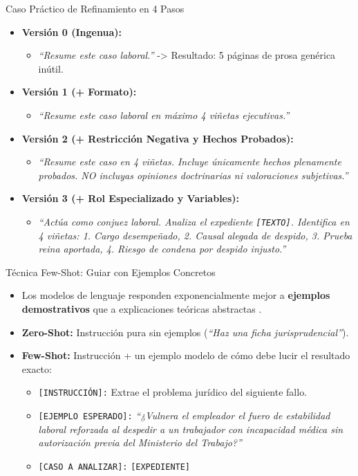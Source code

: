 \documentclass[aspectratio=169]{beamer}
\begin{document}
\begin{frame}{Caso Práctico de Refinamiento en 4 Pasos}

\begin{itemize}
  \item \textbf{Versión 0 (Ingenua):}
  \begin{itemize}
    \item \textit{``Resume este caso laboral.''} -> Resultado: 5 páginas de prosa genérica inútil.
  \end{itemize}
  \item \textbf{Versión 1 (+ Formato):}
  \begin{itemize}
    \item \textit{``Resume este caso laboral en máximo 4 viñetas ejecutivas.''}
  \end{itemize}
  \item \textbf{Versión 2 (+ Restricción Negativa y Hechos Probados):}
  \begin{itemize}
    \item \textit{``Resume este caso en 4 viñetas. Incluye únicamente hechos plenamente probados. NO incluyas opiniones doctrinarias ni valoraciones subjetivas.''}
  \end{itemize}
  \item \textbf{Versión 3 (+ Rol Especializado y Variables):}
  \begin{itemize}
    \item \textit{``Actúa como conjuez laboral. Analiza el expediente \texttt{[TEXTO]}. Identifica en 4 viñetas: 1. Cargo desempeñado, 2. Causal alegada de despido, 3. Prueba reina aportada, 4. Riesgo de condena por despido injusto.''}
  \end{itemize}
\end{itemize}
\end{frame}

\begin{frame}{Técnica Few-Shot: Guiar con Ejemplos Concretos}

\begin{itemize}
  \item Los modelos de lenguaje responden exponencialmente mejor a \textbf{ejemplos demostrativos} que a explicaciones teóricas abstractas \cite{sal2024}.
  \item \textbf{Zero-Shot:} Instrucción pura sin ejemplos (\textit{``Haz una ficha jurisprudencial''}).
  \item \textbf{Few-Shot:} Instrucción + un ejemplo modelo de cómo debe lucir el resultado exacto:
  \begin{itemize}
    \item \texttt{[INSTRUCCIÓN]:} Extrae el problema jurídico del siguiente fallo.
    \item \texttt{[EJEMPLO ESPERADO]:} \textit{``¿Vulnera el empleador el fuero de estabilidad laboral reforzada al despedir a un trabajador con incapacidad médica sin autorización previa del Ministerio del Trabajo?''}
    \item \texttt{[CASO A ANALIZAR]:} \texttt{[EXPEDIENTE]}
  \end{itemize}
\end{itemize}
\end{frame}
\end{document}
